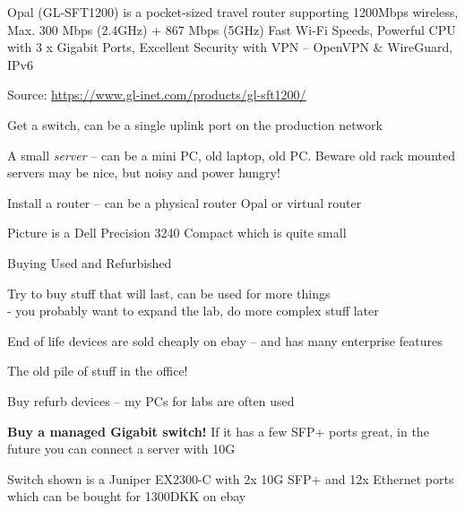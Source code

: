 \documentclass[Screen16to9,17pt]{foils}
\begin{document}

\begin{list2}
\item Opal (GL-SFT1200) is a pocket-sized travel router supporting 1200Mbps wireless,
Max. 300 Mbps (2.4GHz) + 867 Mbps (5GHz) Fast Wi-Fi Speeds, Powerful CPU with 3 x Gigabit Ports,
Excellent Security with VPN -- OpenVPN \& WireGuard, IPv6
\end{list2}
Source: \url{https://www.gl-inet.com/products/gl-sft1200/}




\begin{list2}
\item Get a switch, can be a single uplink port on the production network
\item A small \emph{server} -- can be a mini PC, old laptop, old PC. Beware old rack mounted servers may be nice, but noisy and power hungry!
\item Install a router -- can be a physical router Opal or virtual router
\item Picture is a Dell Precision 3240 Compact which is quite small
\end{list2}





Buying Used and Refurbished
\begin{list2}
\item Try to buy stuff that will last, can be used for more things\\
- you probably want to expand the lab, do more complex stuff later
\item End of life devices are sold cheaply on ebay -- and has many enterprise features
\item The old pile of stuff in the office!
\item Buy refurb devices -- my PCs for labs are often used
\item {\bf Buy a managed Gigabit switch!} If it has a few SFP+ ports great, in the future you can connect a server with 10G
\item Switch shown is a Juniper EX2300-C with 2x 10G SFP+ and 12x Ethernet ports which can be bought for 1300DKK on ebay
\end{list2}
\end{document}
